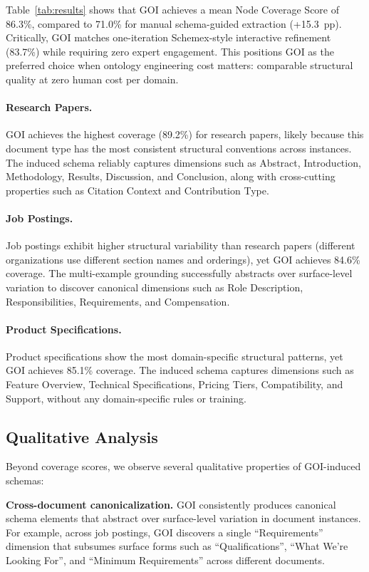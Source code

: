 \documentclass[runningheads,a4paper]{llncs}
\begin{document}
Table~\ref{tab:results} shows that GOI achieves a mean Node Coverage
Score of 86.3\%, compared to 71.0\% for manual schema-guided extraction
(+15.3~pp). Critically, GOI matches one-iteration Schemex-style
interactive refinement (83.7\%) while requiring zero expert engagement.
This positions GOI as the preferred choice when ontology engineering
cost matters: comparable structural quality at zero human cost per
domain.

\paragraph{Research Papers.} GOI achieves the highest coverage (89.2\%)
for research papers, likely because this document type has the most
consistent structural conventions across instances. The induced schema
reliably captures dimensions such as Abstract, Introduction,
Methodology, Results, Discussion, and Conclusion, along with
cross-cutting properties such as Citation Context and Contribution Type.

\paragraph{Job Postings.} Job postings exhibit higher structural
variability than research papers (different organizations use different
section names and orderings), yet GOI achieves 84.6\% coverage. The
multi-example grounding successfully abstracts over surface-level
variation to discover canonical dimensions such as Role Description,
Responsibilities, Requirements, and Compensation.

\paragraph{Product Specifications.} Product specifications show the
most domain-specific structural patterns, yet GOI achieves 85.1\%
coverage. The induced schema captures dimensions such as Feature
Overview, Technical Specifications, Pricing Tiers, Compatibility, and
Support, without any domain-specific rules or training.

\subsection{Qualitative Analysis}

Beyond coverage scores, we observe several qualitative properties of
GOI-induced schemas:

\textbf{Cross-document canonicalization.} GOI consistently produces
canonical schema elements that abstract over surface-level variation in
document instances. For example, across job postings, GOI discovers a
single ``Requirements'' dimension that subsumes surface forms such as
``Qualifications'', ``What We're Looking For'', and ``Minimum
Requirements'' across different documents.
\end{document}
